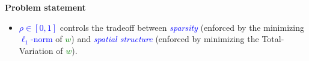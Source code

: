 \documentclass[french]{STIC_poster}
\begin{document}
\begin{frame}[t]
\begin{columns}[t]
\begin{column}{.48\linewidth}
\begin{sxbox}[\textwidth]{\textbf{Problem statement}}
\begin{itemize}
\begin{itemize}
                                      \item \textcolor{blue}{$\rho \in [0, 1]$} controls the tradeoff between \textcolor{blue}{\textit{sparsity}}
                                        (enforced by the minimizing \textcolor{blue}{$\ell_1$-norm} of \textcolor{green}{$w$}) and
                                        \textcolor{blue}{\textit{spatial structure}} (enforced by minimizing the Total-Variation of \textcolor{green}{$w$}).
                                    \end{itemize}
                                  \end{itemize}


\end{sxbox}
\end{column}
\end{columns}
\end{frame}
\end{document}
